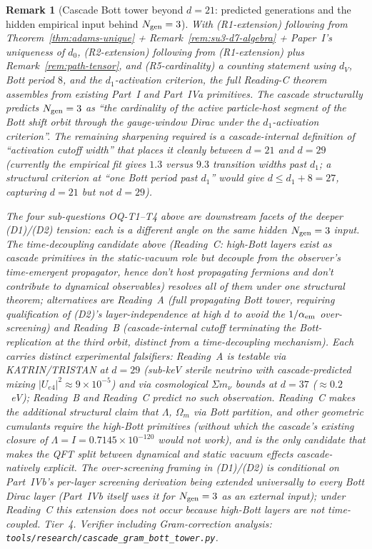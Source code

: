 \documentclass[12pt,a4paper]{article}
\newtheorem{remark}[theorem]{Remark}
\begin{document}
\begin{remark}[Cascade Bott tower beyond $d=21$: predicted generations and the hidden empirical input behind $N_{\rm gen}=3$]
With (R1-extension) following from Theorem~\ref{thm:adams-unique} + Remark~\ref{rem:su3-d7-algebra} + Paper~I's uniqueness of $d_0$, (R2-extension) following from (R1-extension) plus Remark~\ref{rem:path-tensor}, and (R5-cardinality) a counting statement using $d_V$, Bott period $8$, and the $d_1$-activation criterion, the full Reading-C theorem assembles from existing Part~I and Part~IVa primitives. The cascade structurally predicts $N_{\rm gen}=3$ as ``the cardinality of the active particle-host segment of the Bott shift orbit through the gauge-window Dirac under the $d_1$-activation criterion''. The remaining sharpening required is a cascade-internal definition of ``activation cutoff width'' that places it cleanly between $d=21$ and $d=29$ (currently the empirical fit gives $1.3$ versus $9.3$ transition widths past $d_1$; a structural criterion at ``one Bott period past $d_1$'' would give $d \leq d_1 + 8 = 27$, capturing $d=21$ but not $d=29$).

\medskip
The four sub-questions OQ-T1--T4 above are downstream facets of the deeper (D1)/(D2) tension: each is a different angle on the same hidden $N_{\rm gen}=3$ input. The time-decoupling candidate above (Reading~C: high-Bott layers exist as cascade primitives in the static-vacuum role but decouple from the observer's time-emergent propagator, hence don't host propagating fermions and don't contribute to dynamical observables) resolves all of them under one structural theorem; alternatives are Reading~A (full propagating Bott tower, requiring qualification of (D2)'s layer-independence at high $d$ to avoid the $1/\alpha_{\rm em}$ over-screening) and Reading~B (cascade-internal cutoff terminating the Bott-replication at the third orbit, distinct from a time-decoupling mechanism). Each carries distinct experimental falsifiers: Reading~A is testable via KATRIN/TRISTAN at $d=29$ (sub-keV sterile neutrino with cascade-predicted mixing $|U_{e4}|^2 \approx 9 \times 10^{-5}$) and via cosmological $\Sigma m_\nu$ bounds at $d=37$ ($\approx 0.2$~eV); Reading~B and Reading~C predict no such observation. Reading~C makes the additional structural claim that $\Lambda$, $\Omega_m$ via Bott partition, and other geometric cumulants \emph{require} the high-Bott primitives (without which the cascade's existing closure of $\Lambda = I = 0.7145 \times 10^{-120}$ would not work), and is the only candidate that makes the QFT split between dynamical and static vacuum effects cascade-natively explicit. The over-screening framing in (D1)/(D2) is conditional on Part~IVb's per-layer screening derivation being extended universally to every Bott Dirac layer (Part~IVb itself uses it for $N_{\rm gen}=3$ as an external input); under Reading~C this extension does not occur because high-Bott layers are not time-coupled. Tier~4. Verifier including Gram-correction analysis: \texttt{tools/research/cascade\_gram\_bott\_tower.py}.
\end{remark}
\end{document}
